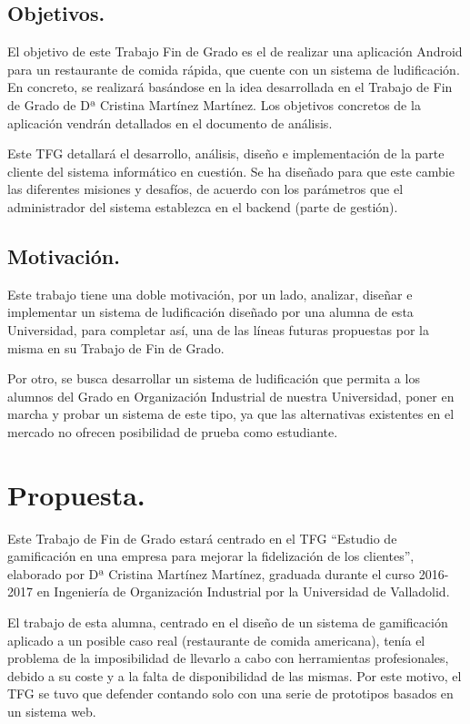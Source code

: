 \documentclass[twoside]{report}
\begin{document}
\subsection{Objetivos.}
El objetivo de este Trabajo Fin de Grado es el de realizar una aplicación Android para un restaurante de comida rápida, que cuente con un sistema de ludificación. En concreto, se realizará basándose en la idea desarrollada en el Trabajo de Fin de Grado de Dª Cristina Martínez Martínez\cite{cristinatfg}. Los objetivos concretos de la aplicación vendrán detallados en el documento de análisis.

Este TFG detallará el desarrollo, análisis, diseño e implementación de la parte cliente del sistema informático en cuestión. Se ha diseñado para que este cambie las diferentes misiones y desafíos, de acuerdo con los parámetros que el administrador del sistema establezca en el backend (parte de gestión).

\subsection{Motivación.}
Este trabajo tiene una doble motivación, por un lado, analizar, diseñar e implementar un sistema de ludificación diseñado por una alumna de esta Universidad, para completar así, una de las líneas futuras propuestas por la misma en su Trabajo de Fin de Grado. 

Por otro, se busca desarrollar un sistema de ludificación que permita a los alumnos del Grado en Organización Industrial de nuestra Universidad, poner en marcha y probar un sistema de este tipo, ya que las alternativas existentes en el mercado no ofrecen posibilidad de prueba como estudiante.
\section{Propuesta.}
Este Trabajo de Fin de Grado estará centrado en el TFG “Estudio de gamificación en una empresa para mejorar la fidelización de los clientes”\cite{cristinatfg}, elaborado por Dª Cristina Martínez Martínez, graduada durante el curso 2016-2017 en Ingeniería de Organización Industrial por la Universidad de Valladolid.  

El trabajo de esta alumna, centrado en el diseño de un sistema de gamificación aplicado a un posible caso real (restaurante de comida americana), tenía el problema de la imposibilidad de llevarlo a cabo con herramientas profesionales, debido a su coste y a la falta de disponibilidad de las mismas. Por este motivo, el TFG se tuvo que defender contando solo con una serie de prototipos basados en un sistema web. 
\end{document}
